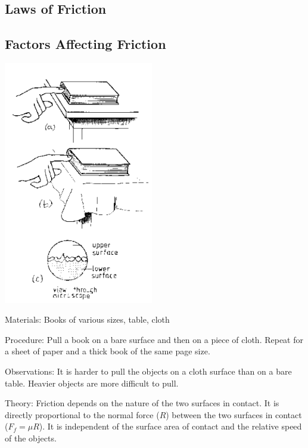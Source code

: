 \begin{multicols}{2}

\section*{Laws of Friction}


\subsection{Factors Affecting Friction}

\begin{center}
\includegraphics[width=0.49\textwidth]{./img/source/friction-factors.png}
\end{center}

\begin{description*}
\item[Materials:]{Books of various sizes, table, cloth}
\item[Procedure:]{Pull a book on a bare surface and then on a piece of cloth. Repeat for a sheet of paper and a thick book of the same page size.}
\item[Observations:]{It is harder to pull the objects on a cloth surface than on a bare table. Heavier objects are more difficult to pull.}
\item[Theory:]{Friction depends on the nature of the two surfaces in contact. It is directly proportional to the normal force ($R$) between the two surfaces in contact ($F_f=\mu R$). It is independent of the surface area of contact and the relative speed of the objects.}
\end{description*}


\end{multicols}
